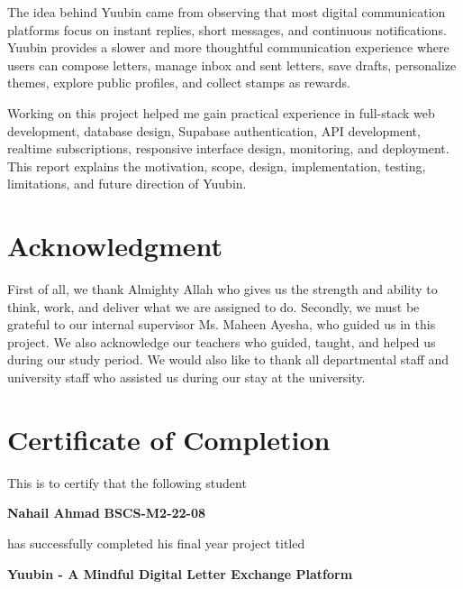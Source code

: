 ﻿\documentclass[12pt,a4paper]{report}
\begin{document}
The idea behind Yuubin came from observing that most digital communication platforms focus on instant replies, short messages, and continuous notifications. Yuubin provides a slower and more thoughtful communication experience where users can compose letters, manage inbox and sent letters, save drafts, personalize themes, explore public profiles, and collect stamps as rewards.

Working on this project helped me gain practical experience in full-stack web development, database design, Supabase authentication, API development, realtime subscriptions, responsive interface design, monitoring, and deployment. This report explains the motivation, scope, design, implementation, testing, limitations, and future direction of Yuubin.

\chapter*{Acknowledgment}
\thispagestyle{empty}

First of all, we thank Almighty Allah who gives us the strength and ability to think, work, and deliver what we are assigned to do. Secondly, we must be grateful to our internal supervisor Ms. Maheen Ayesha, who guided us in this project. We also acknowledge our teachers who guided, taught, and helped us during our study period. We would also like to thank all departmental staff and university staff who assisted us during our stay at the university.

\chapter*{Certificate of Completion}
\thispagestyle{empty}

This is to certify that the following student
\vspace{0.5cm}

\noindent \textbf{Nahail Ahmad} \hfill \textbf{BSCS-M2-22-08}
\vspace{0.5cm}

has successfully completed his final year project titled
\vspace{0.5cm}

\textbf{Yuubin - A Mindful Digital Letter Exchange Platform}
\vspace{0.5cm}
\end{document}
